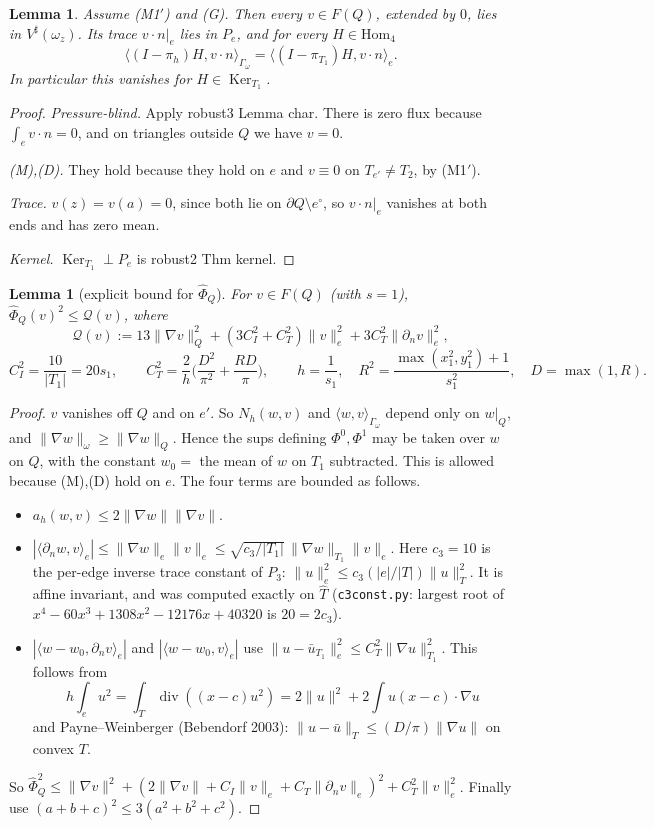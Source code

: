 \documentclass[11pt]{article}
\newtheorem{lemma}[theorem]{Lemma}
\theoremstyle{remark}
\newcommand{\ip}[2]{\langle #1,#2\rangle}
\begin{document}
\begin{lemma}\label{lem:sub}
Assume (M1$'$) and (G). Then every $v\in F(Q)$, extended by $0$, lies in $V^\sharp(\omega_z)$. Its trace $v\cdot n|_e$ lies in
$P_e$, and for every $H\in\mathrm{Hom}_4$
\[
\ip{(I-\pi_h)H}{v\cdot n}_{\Gamma_\omega}=\ip{(I-\pi_{T_1})H}{v\cdot n}_e .
\]
In particular this vanishes for $H\in\operatorname{Ker}_{T_1}$.
\end{lemma}
\begin{proof}
\emph{Pressure-blind.} Apply robust3 Lemma char. There is zero flux because $\int_ev\cdot n=0$, and on triangles outside $Q$ we have $v=0$.

\emph{(M),(D).} They hold because they hold on $e$ and $v\equiv0$ on $T_{e'}\ne T_2$, by (M1$'$).

\emph{Trace.} $v(z)=v(a)=0$, since both lie on $\partial Q\setminus e^\circ$, so $v\cdot n|_e$ vanishes at both ends and has zero mean.

\emph{Kernel.} $\operatorname{Ker}_{T_1}\perp P_e$ is robust2 Thm kernel.
\end{proof}

\begin{lemma}[explicit bound for $\hat\Phi_Q$]\label{lem:phi}
For $v\in F(Q)$ (with $s=1$), $\hat\Phi_Q(v)^2\le\mathcal Q(v)$, where
\[
\mathcal Q(v):=13\|\nabla v\|_Q^2+(3C_I^2+C_T^2)\|v\|_e^2+3C_T^2\|\partial_nv\|_e^2,
\]
\[
C_I^2=\frac{10}{|T_1|}=20s_1,\qquad
C_T^2=\frac2h\Big(\frac{D^2}{\pi^2}+\frac{RD}\pi\Big),\qquad
h=\frac1{s_1},\quad R^2=\frac{\max(x_1^2,y_1^2)+1}{s_1^2},\quad D=\max(1,R).
\]
\end{lemma}
\begin{proof}
$v$ vanishes off $Q$ and on $e'$. So $N_h(w,v)$ and $\ip wv_{\Gamma_\omega}$ depend only on $w|_Q$, and
$\|\nabla w\|_\omega\ge\|\nabla w\|_Q$. Hence the sups defining $\Phi^0,\Phi^1$ may be taken over $w$ on $Q$, with the
constant $w_0=$ the mean of $w$ on $T_1$ subtracted. This is allowed because (M),(D) hold on $e$. The four terms are bounded as follows.
\begin{itemize}
\item $a_h(w,v)\le2\|\nabla w\|\|\nabla v\|$.
\item $|\ip{\partial_nw}v_e|\le\|\nabla w\|_e\|v\|_e\le\sqrt{c_3/|T_1|}\,\|\nabla w\|_{T_1}\|v\|_e$. Here $c_3=10$ is the per-edge inverse trace
 constant of $P_3$: $\|u\|_e^2\le c_3(|e|/|T|)\|u\|_T^2$. It is affine invariant, and was computed exactly on $\hat T$ (\texttt{c3const.py}: largest
 root of $x^4-60x^3+1308x^2-12176x+40320$ is $20=2c_3$).
\item $|\ip{w-w_0}{\partial_nv}_e|$ and $|\ip{w-w_0}v_e|$ use $\|u-\bar u_{T_1}\|_e^2\le C_T^2\|\nabla u\|_{T_1}^2$. This follows from
 \[
 h\int_eu^2=\int_{T}\operatorname{div}((x-c)u^2)=2\|u\|^2+2\!\int u(x-c)\cdot\nabla u
 \]
 and Payne--Weinberger (Bebendorf 2003): $\|u-\bar u\|_T\le(D/\pi)\|\nabla u\|$ on convex $T$.
\end{itemize}
So $\hat\Phi_Q^2\le\|\nabla v\|^2+(2\|\nabla v\|+C_I\|v\|_e+C_T\|\partial_nv\|_e)^2+C_T^2\|v\|_e^2$. Finally use $(a+b+c)^2\le3(a^2+b^2+c^2)$.
\end{proof}
\end{document}
